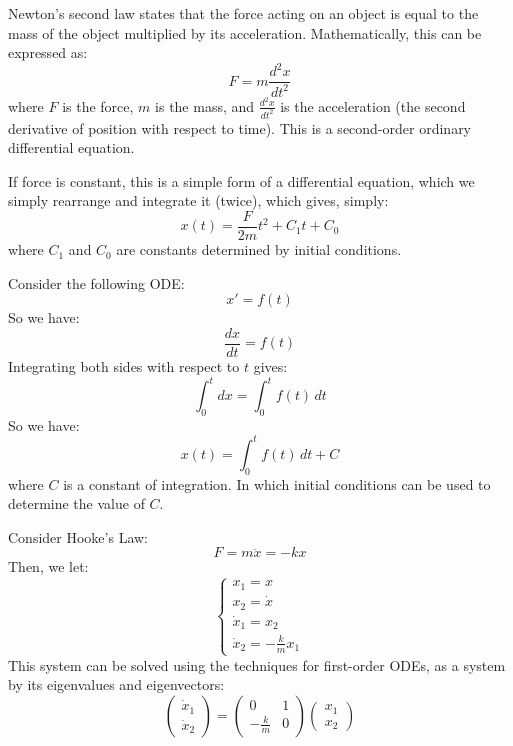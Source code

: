 \documentclass[11pt]{article}
\begin{document}
\begin{example}
    Newton's second law states that the force acting on an object is equal to the mass of the object multiplied by its acceleration. Mathematically, this can be expressed as:
    $$
    F = m \frac{d^2x}{dt^2}
    $$
    where \( F \) is the force, \( m \) is the mass, and \( \frac{d^2x}{dt^2} \) is the acceleration (the second derivative of position with respect to time). This is a second-order ordinary differential equation.

    If force is constant, this is a simple form of a differential equation, which we simply rearrange and integrate it (twice), which gives, simply:
    $$
    x(t) = \frac{F}{2m} t^2 + C_1 t + C_0
    $$
    where \( C_1 \) and \( C_0 \) are constants determined by initial conditions.
\end{example}

\begin{example}
    Consider the following ODE:
    $$
    x' = f(t)
    $$
    So we have:
    $$
    \frac{dx}{dt} = f(t)
    $$
    Integrating both sides with respect to \( t \) gives:
    $$
    \int_0^t dx = \int_0^t f(t) \, dt
    $$
    So we have:
    $$
    x(t) = \int_0^t f(t) \, dt + C
    $$
    where \( C \) is a constant of integration. In which initial conditions can be used to determine the value of \( C \).  
\end{example}

\begin{example}
    Consider Hooke's Law:
    $$
    F = m\ddot{x} = -kx
    $$
    Then, we let:
    $$
    \begin{cases}
        x_1 = x \\
        x_2 = \dot{x} \\
        \dot{x}_1 = x_2 \\
        \dot{x}_2 = -\frac{k}{m} x_1
    \end{cases}
    $$
    This system can be solved using the techniques for first-order ODEs, as a system by its eigenvalues and eigenvectors:
    $$
    \begin{pmatrix}
        \dot{x}_1 \\
        \dot{x}_2
    \end{pmatrix}
    =
    \begin{pmatrix}
        0 & 1 \\
        -\frac{k}{m} & 0
    \end{pmatrix}
    \begin{pmatrix}
        x_1 \\
        x_2
    \end{pmatrix}
    $$
\end{example}
\end{document}
